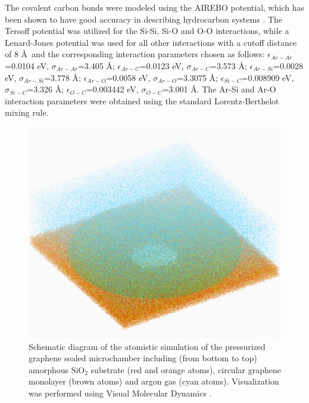 The covalent carbon bonds were modeled using the AIREBO \cite{stuartJCP2000} potential, which has been shown to have good accuracy in describing hydrocarbon systems \cite{qiNANO2010,zhaoJAP2010}.
The Tersoff \cite{tersoffPRB1988} potential was utilized for the Si-Si, Si-O and O-O interactions, while a Lenard-Jones potential was used for all other interactions with a cutoff distance of 8 \AA \ and the corresponding interaction parameters chosen as follows: $\epsilon_{Ar-Ar}$=0.0104 eV, $\sigma_{Ar-Ar}$=3.405 \AA \cite{RytkonenJchemp1998}; $\epsilon_{Ar-C}$=0.0123 eV, $\sigma_{Ar-C}$=3.573 \AA \cite{RobertNano1996}; $\epsilon_{Ar-Si}$=0.0028 eV, $\sigma_{Ar-Si}$=3.778 \AA \cite{LiPRA2010}; $\epsilon_{Ar-O}$=0.0058 eV, $\sigma_{Ar-O}$=3.3075 \AA \cite{EverittJCP1999}; $\epsilon_{Si-C}$=0.008909 eV, $\sigma_{Si-C}$=3.326 \AA \cite{OngPRB2010}; $\epsilon_{O-C}$=0.003442 eV, $\sigma_{O-C}$=3.001 \AA \cite{OngPRB2010}.
The Ar-Si and Ar-O interaction parameters were obtained using the standard Lorentz-Berthelot mixing rule.

\begin{figure}
	\begin{center}
	\includegraphics[scale=0.12]{Figs_Friction/MD.pdf}
	\end{center}
	\caption[Schematic diagram of the atomistic simulation]{\label{fig:fri:MD} Schematic diagram of the atomistic simulation of the pressurized graphene sealed microchamber including (from bottom to top) amorphous SiO$_{2}$ substrate (red and orange atoms), circular graphene monolayer (brown atoms) and argon gas (cyan atoms). Visualization was performed using Visual Molecular Dynamics \cite{Humphrey1996}.}
\end{figure}

